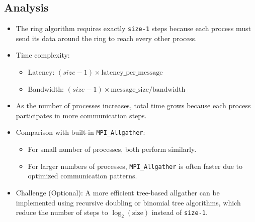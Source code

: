 \documentclass[a4paper,12pt]{article}
\begin{document}
\subsection{Analysis}
\begin{itemize}
    \item The ring algorithm requires exactly \texttt{size-1} steps because each process must send its data around the ring to reach every other process.
    \item Time complexity:
        \begin{itemize}
            \item Latency: $(size-1) \times \text{latency\_per\_message}$
            \item Bandwidth: $(size-1) \times \text{message\_size} / \text{bandwidth}$
        \end{itemize}
    \item As the number of processes increases, total time grows because each process participates in more communication steps.
    \item Comparison with built-in \texttt{MPI\_Allgather}:
        \begin{itemize}
            \item For small number of processes, both perform similarly.
            \item For larger numbers of processes, \texttt{MPI\_Allgather} is often faster due to optimized communication patterns.
        \end{itemize}
    \item Challenge (Optional): A more efficient tree-based allgather can be implemented using recursive doubling or binomial tree algorithms, which reduce the number of steps to $\log_2(\text{size})$ instead of \texttt{size-1}.
\end{itemize}
\end{document}

